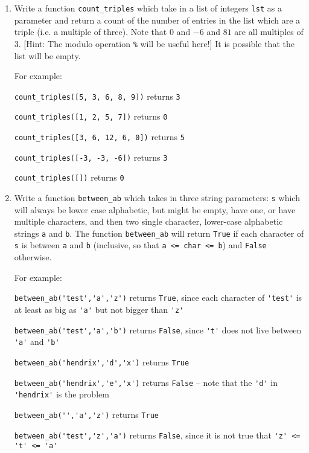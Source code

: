 \documentclass{article}
\begin{document}
\newpage

\begin{enumerate}
\item Write a function \verb|count_triples| which take in a list of integers \verb|lst| as a parameter and return a count of the number of entries in the list which are a triple (i.e. a multiple of three). Note that $0$ and $-6$ and $81$ are all multiples of 3. [Hint: The modulo operation \verb|%| will be useful here!] It is possible that the list will be empty.

    For example:

\verb|count_triples([5, 3, 6, 8, 9])| returns \verb|3|

\verb|count_triples([1, 2, 5, 7])| returns \verb|0|

\verb|count_triples([3, 6, 12, 6, 0])| returns \verb|5|

\verb|count_triples([-3, -3, -6])| returns \verb|3|

\verb|count_triples([])| returns \verb|0|

\vfill

\item Write a function \verb|between_ab| which takes in three string parameters: \verb|s| which will always be lower case alphabetic, but might be empty, have one, or have multiple characters, and then two single character, lower-case alphabetic strings \verb|a| and \verb|b|. The function \verb|between_ab| will return \verb|True| if each character of \verb|s| is between \verb|a| and \verb|b| (inclusive, so that \verb|a <= char <= b|) and \verb|False| otherwise.

    For example:

\verb|between_ab('test','a','z')| returns \verb|True|, since each character of \verb|'test'| is at least as big as \verb|'a'| but not bigger than \verb|'z'|

\verb|between_ab('test','a','b')| returns \verb|False|, since \verb|'t'| does not live between \verb|'a'| and \verb|'b'|

\verb|between_ab('hendrix','d','x')| returns \verb|True|

\verb|between_ab('hendrix','e','x')| returns \verb|False| -- note that the \verb|'d'| in \verb|'hendrix'| is the problem

\verb|between_ab('','a','z')| returns \verb|True|

\verb|between_ab('test','z','a')| returns \verb|False|, since it is not true that \verb|'z' <= 't' <= 'a'|

\vfill
\eject


\end{enumerate}
\end{document}
